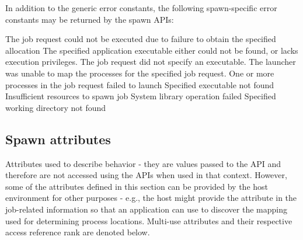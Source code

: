 In addition to the generic error constants, the following spawn-specific error constants may be returned by the spawn \acp{API}:

\begin{constantdesc}
%
The job request could not be executed due to failure to obtain the specified allocation
%
The specified application executable either could not be found, or lacks execution privileges.
%
The job request did not specify an executable.
%
The launcher was unable to map the processes for the specified job request.
%
One or more processes in the job request failed to launch
%
Specified executable not found
%
Insufficient resources to spawn job
%
System library operation failed
%
Specified working directory not found
%
\end{constantdesc}

\subsection{Spawn attributes}
\label{api:struct:attributes:spawn}

Attributes used to describe  behavior - they are values passed to the  \ac{API} and therefore are not accessed using the  \acp{API} when used in that context. However, some of the attributes defined in this section can be provided by the host environment for other purposes - e.g., the host might provide the  attribute in the job-related information so that an application can use  to discover the mapping used for determining process locations. Multi-use attributes and their respective access reference rank are denoted below.

